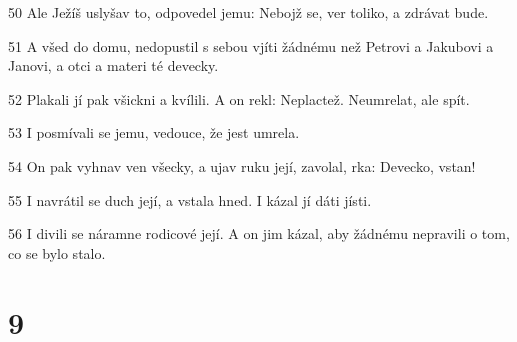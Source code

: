 \par 50 Ale Ježíš uslyšav to, odpovedel jemu: Nebojž se, ver toliko, a zdrávat bude.
\par 51 A všed do domu, nedopustil s sebou vjíti žádnému než Petrovi a Jakubovi a Janovi, a otci a materi té devecky.
\par 52 Plakali jí pak všickni a kvílili. A on rekl: Neplactež. Neumrelat, ale spít.
\par 53 I posmívali se jemu, vedouce, že jest umrela.
\par 54 On pak vyhnav ven všecky, a ujav ruku její, zavolal, rka: Devecko, vstan!
\par 55 I navrátil se duch její, a vstala hned. I kázal jí dáti jísti.
\par 56 I divili se náramne rodicové její. A on jim kázal, aby žádnému nepravili o tom, co se bylo stalo.

\chapter{9}

